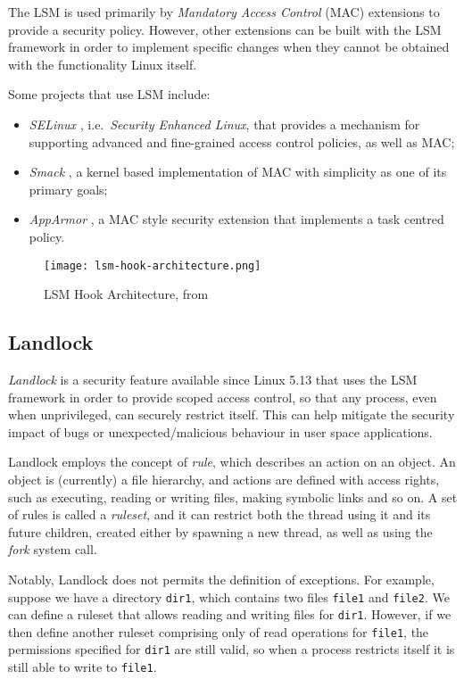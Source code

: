 The LSM is used primarily by \textit{Mandatory Access Control} (MAC) extensions to
provide a security policy. However, other extensions can be built with the LSM framework
in order to implement specific changes when they cannot be obtained with the functionality Linux itself.

Some projects that use LSM include:
\begin{itemize}
  \item \textit{SELinux} \cite{selinux}, i.e.\ \textit{Security Enhanced Linux}, that provides a mechanism for supporting advanced and fine-grained access control policies, as well as MAC;
  \item \textit{Smack} \cite{smack}, a kernel based implementation of MAC with simplicity as one of its primary goals;
  \item \textit{AppArmor} \cite{apparmor}, a MAC style security extension that implements a task centred policy.
\end{itemize}

\begin{figure}[ht]
  \centering
  \texttt{[image: lsm-hook-architecture.png]}
  \caption{LSM Hook Architecture, from \cite{kernel-lsm}}
  \label{fig:lsm-hook-architecture}
\end{figure}

\subsection{Landlock}
\textit{Landlock} \cite{landlock-kernel, landlock-user-space} is a security feature available since Linux 5.13
that uses the LSM framework in order to provide scoped access control,
so that any process, even when unprivileged, can securely restrict itself.
This can help mitigate the security impact of bugs or unexpected/malicious behaviour
in user space applications.

Landlock employs the concept of \textit{rule}, which describes an action
on an object. An object is (currently) a file hierarchy, and actions are
defined with access rights, such as executing, reading or writing files, making
symbolic links and so on.
A set of rules is called a \textit{ruleset}, and it can restrict both the thread
using it and its future children, created either by spawning a new thread, as well
as using the \textit{fork} system call.

Notably, Landlock does not permits the definition of exceptions.
For example, suppose we have a directory \texttt{dir1}, which contains two files
\texttt{file1} and \texttt{file2}. We can define a ruleset that allows
reading and writing files for \texttt{dir1}.
However, if we then define another ruleset comprising only of read operations
for \texttt{file1}, the permissions specified for \texttt{dir1} are still
valid, so when a process restricts itself it is still able to write to \texttt{file1}.

